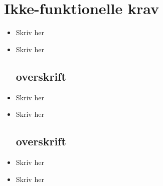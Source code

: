 \section{Ikke-funktionelle krav}
\begin{itemize}

\subsection*{overskrift}
\item Skriv her
\item Skriv her

\subsection*{overskrift}
\item Skriv her
\item Skriv her

\subsection*{overskrift}
\item Skriv her
\item Skriv her

\end{itemize}